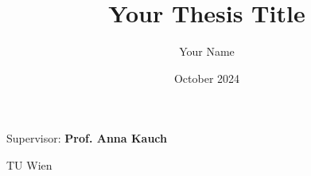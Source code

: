 \documentclass{article}
\title{Your Thesis Title}
\author{Your Name}
\date{October 2024}
\begin{document}
\begin{titlepage}
    \centering
    \vspace*{2cm}
    
    {\Huge \bfseries \thetitle \par}
    \vspace{1.5cm}
    
    {\Large \bfseries \theauthor \par}
    \vspace{1cm}
    
    Supervisor: \textbf{Prof. Anna Kauch} \par
    \vspace{0.5cm}
    
    \thedate \par
    \vspace{1.5cm}
    
    
    \vfill
    \Large TU Wien
\end{titlepage}

\newpage
{}
\end{document}
